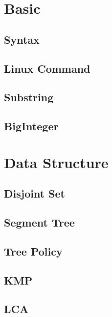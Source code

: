 \section{Basic}

\subsection{Syntax}


\subsection{Linux Command}


\subsection{Substring}


\subsection{BigInteger}

\section{Data Structure}

\subsection{Disjoint Set}


\subsection{Segment Tree}


\subsection{Tree Policy}


\subsection{KMP}


\subsection{LCA}

